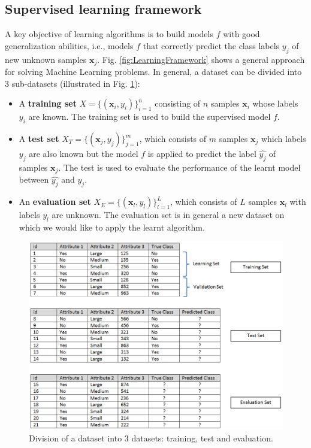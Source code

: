 \subsection{Supervised learning framework}
A key objective of learning algorithms is to build models $f$ with good generalization abilities, i.e., models $f$ that correctly predict the class labels $y_j$ of new unknown samples $\textbf{x}_j$. Fig. \ref{fig:LearningFramework} shows a general approach for solving Machine Learning problems. In general, a dataset can be divided into 3 sub-datasets (illustrated in Fig. \ref{fig:Dataset}):
\begin{itemize}
	\item A \textbf{training set} $X=\{(\textbf{x}_i,y_i)\}_{i=1}^n$ consisting of $n$ samples $\textbf{x}_i$ whose labels $y_i$ are known. The training set is used to build the supervised model $f$. 
	\item A \textbf{test set} $X_T=\{(\textbf{x}_j,y_j)\}_{j=1}^m$, which consists of $m$ samples $\textbf{x}_j$ which labels $y_j$ are also known but the model $f$ is applied to predict the label $\hat{y_j}$ of samples $\textbf{x}_j$. The test is used to evaluate the performance of the learnt model between $\hat{y_j}$ and $y_j$. 
	\item An \textbf{evaluation set} $X_E=\{(\textbf{x}_l,y_l)\}_{l=1}^L$, which consists of $L$ samples $\textbf{x}_l$ with labels $y_l$ are unknown. The evaluation set is in general a new dataset on which we would like to apply the learnt algorithm. 
\end{itemize}

\begin{figure}[h!]
\centering
\includegraphics[width=0.9\linewidth]{images/Dataset}
\caption{Division of a dataset into 3 datasets: training, test and evaluation.}
\label{fig:Dataset}
\end{figure}

